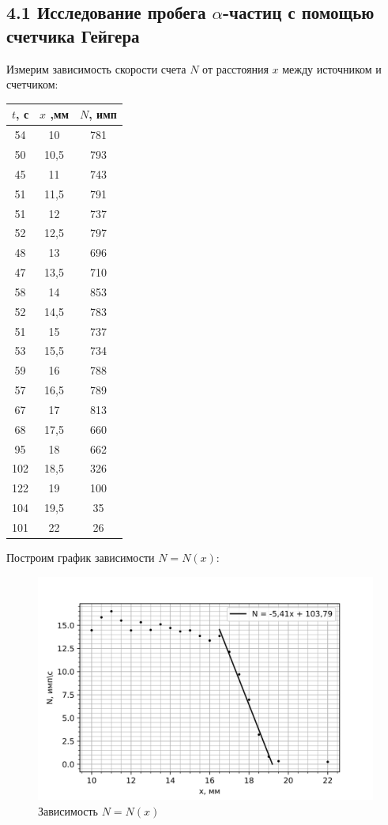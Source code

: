\documentclass[a4paper,12pt]{report}
\begin{document}
\subsection*{4.1 Исследование пробега $\alpha$-частиц с помощью счетчика Гейгера}

Измерим зависимость скорости счета $N$ от расстояния $x$ между источником и счетчиком:

\begin{table}[H]
\begin{tabular}{|c|c|c|}
\hline
$t$, с & $x$ ,мм & $N$, имп \\ \hline
54   & 10    & 781    \\ \hline
50   & 10,5  & 793    \\ \hline
45   & 11    & 743    \\ \hline
51   & 11,5  & 791    \\ \hline
51   & 12    & 737    \\ \hline
52   & 12,5  & 797    \\ \hline
48   & 13    & 696    \\ \hline
47   & 13,5  & 710    \\ \hline
58   & 14    & 853    \\ \hline
52   & 14,5  & 783    \\ \hline
51   & 15    & 737    \\ \hline
53   & 15,5  & 734    \\ \hline
59   & 16    & 788    \\ \hline
57   & 16,5  & 789    \\ \hline
67   & 17    & 813    \\ \hline
68   & 17,5  & 660    \\ \hline
95   & 18    & 662    \\ \hline
102  & 18,5  & 326    \\ \hline
122  & 19    & 100    \\ \hline
104  & 19,5  & 35     \\ \hline
101  & 22    & 26     \\ \hline
\end{tabular}
\end{table}

Построим график зависимости $N = N(x)$:

	\begin{figure}[H]
		\centering
		\includegraphics[width=0.7\linewidth]{N(x).png}
		\caption{Зависимость $N = N(x)$}
	\end{figure}
\end{document}
